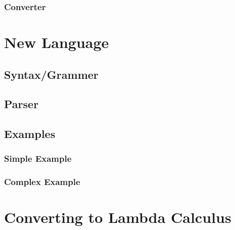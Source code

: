 \documentclass{article}
\begin{document}
\subsubsection{Converter} 


\section{New Language}

\subsection{Syntax/Grammer}
\subsection{Parser}
\subsection{Examples}
\subsubsection{Simple Example}
\subsubsection{Complex Example}

\section{Converting to Lambda Calculus}
\end{document}
